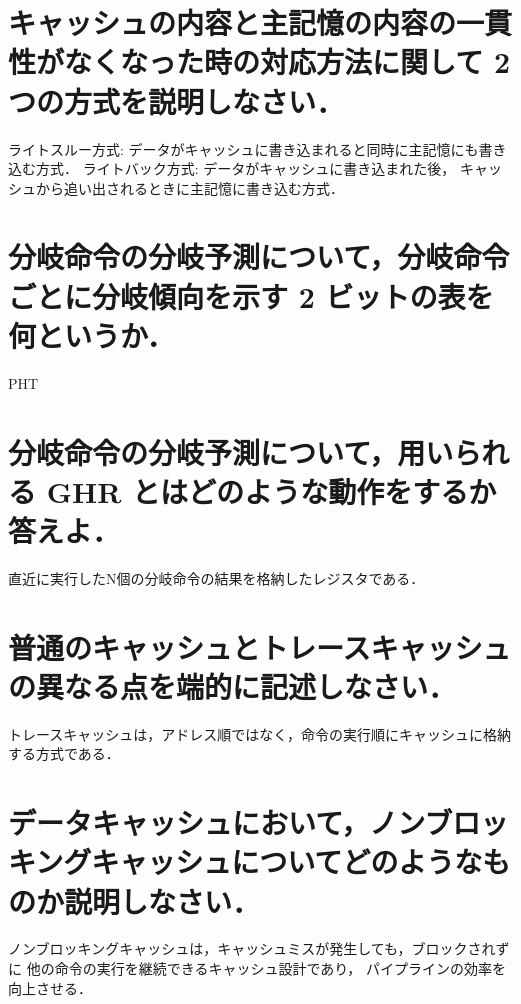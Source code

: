 \documentclass[a4paper,11pt]{ltjsarticle}
\begin{document}
\section{キャッシュの内容と主記憶の内容の⼀貫性がなくなった時の対応⽅法に関して 2 つの⽅式を説明しなさい．}
ライトスルー方式: データがキャッシュに書き込まれると同時に主記憶にも書き込む方式．
ライトバック方式: データがキャッシュに書き込まれた後，
キャッシュから追い出されるときに主記憶に書き込む方式．
\section{分岐命令の分岐予測について，分岐命令ごとに分岐傾向を⽰す 2 ビットの表を何というか．}
PHT
\section{分岐命令の分岐予測について，⽤いられる GHR とはどのような動作をするか答えよ．}
直近に実行したN個の分岐命令の結果を格納したレジスタである．
\section{普通のキャッシュとトレースキャッシュの異なる点を端的に記述しなさい．}
トレースキャッシュは，アドレス順ではなく，命令の実行順にキャッシュに格納する方式である．
\section{データキャッシュにおいて，ノンブロッキングキャッシュについてどのようなものか説明しなさい．}
ノンブロッキングキャッシュは，キャッシュミスが発生しても，ブロックされずに
他の命令の実行を継続できるキャッシュ設計であり，
パイプラインの効率を向上させる．
\end{document}

